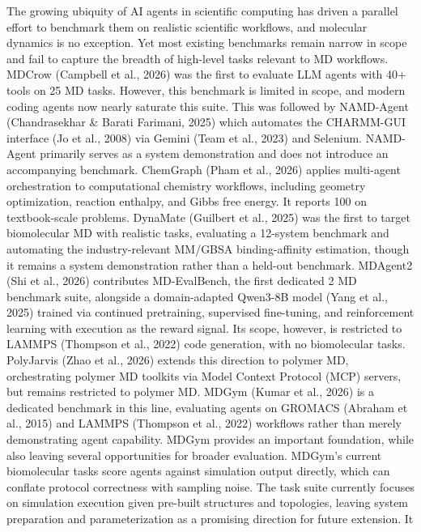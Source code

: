 The growing ubiquity of AI agents in scientific computing has driven a parallel effort to benchmark
them on realistic scientific workflows, and molecular dynamics is no exception. Yet most existing
benchmarks remain narrow in scope and fail to capture the breadth of high-level tasks relevant to MD
workflows.
MDCrow (Campbell et al., 2026) was the first to evaluate LLM agents with 40+ tools on 25 MD tasks.
However, this benchmark is limited in scope, and modern coding agents now nearly saturate this suite.
This was followed by NAMD-Agent (Chandrasekhar & Barati Farimani, 2025) which automates
the CHARMM-GUI interface (Jo et al., 2008) via Gemini (Team et al., 2023) and Selenium.
NAMD-Agent primarily serves as a system demonstration and does not introduce an accompanying
benchmark. ChemGraph (Pham et al., 2026) applies multi-agent orchestration to computational
chemistry workflows, including geometry optimization, reaction enthalpy, and Gibbs free energy.
It reports 100%
on textbook-scale problems. DynaMate (Guilbert et al., 2025) was the first to target biomolecular
MD with realistic tasks, evaluating a 12-system benchmark and automating the industry-relevant
MM/GBSA binding-affinity estimation, though it remains a system demonstration rather than a
held-out benchmark. MDAgent2 (Shi et al., 2026) contributes MD-EvalBench, the first dedicated
2
MD benchmark suite, alongside a domain-adapted Qwen3-8B model (Yang et al., 2025) trained
via continued pretraining, supervised fine-tuning, and reinforcement learning with execution as the
reward signal. Its scope, however, is restricted to LAMMPS (Thompson et al., 2022) code generation,
with no biomolecular tasks. PolyJarvis (Zhao et al., 2026) extends this direction to polymer MD,
orchestrating polymer MD toolkits via Model Context Protocol (MCP) servers, but remains restricted
to polymer MD.
MDGym (Kumar et al., 2026) is a dedicated benchmark in this line, evaluating agents on GROMACS
(Abraham et al., 2015) and LAMMPS (Thompson et al., 2022) workflows rather than merely
demonstrating agent capability. MDGym provides an important foundation, while also leaving
several opportunities for broader evaluation. MDGym’s current biomolecular tasks score agents
against simulation output directly, which can conflate protocol correctness with sampling noise.
The task suite currently focuses on simulation execution given pre-built structures and topologies,
leaving system preparation and parameterization as a promising direction for future extension. It
